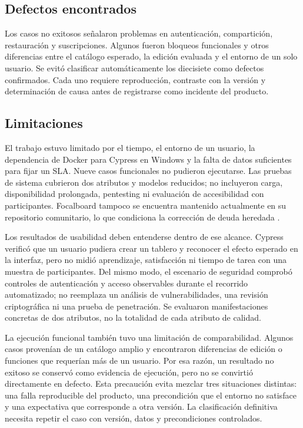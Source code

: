 \documentclass[conference]{IEEEtran}
\begin{document}
\subsection{Defectos encontrados}
Los casos no exitosos señalaron problemas en autenticación, compartición, restauración y suscripciones. Algunos fueron bloqueos funcionales y otros diferencias entre el catálogo esperado, la edición evaluada y el entorno de un solo usuario. Se evitó clasificar automáticamente los diecisiete como defectos confirmados. Cada uno requiere reproducción, contraste con la versión y determinación de causa antes de registrarse como incidente del producto.
\vspace{\baselineskip}

\subsection{Limitaciones}
El trabajo estuvo limitado por el tiempo, el entorno de un usuario, la dependencia de Docker para Cypress en Windows y la falta de datos suficientes para fijar un SLA. Nueve casos funcionales no pudieron ejecutarse. Las pruebas de sistema cubrieron dos atributos y modelos reducidos; no incluyeron carga, disponibilidad prolongada, pentesting ni evaluación de accesibilidad con participantes. Focalboard tampoco se encuentra mantenido actualmente en su repositorio comunitario, lo que condiciona la corrección de deuda heredada \cite{focalboardRepo}.

Los resultados de usabilidad deben entenderse dentro de ese alcance. Cypress verificó que un usuario pudiera crear un tablero y reconocer el efecto esperado en la interfaz, pero no midió aprendizaje, satisfacción ni tiempo de tarea con una muestra de participantes. Del mismo modo, el escenario de seguridad comprobó controles de autenticación y acceso observables durante el recorrido automatizado; no reemplaza un análisis de vulnerabilidades, una revisión criptográfica ni una prueba de penetración. Se evaluaron manifestaciones concretas de dos atributos, no la totalidad de cada atributo de calidad.

La ejecución funcional también tuvo una limitación de comparabilidad. Algunos casos provenían de un catálogo amplio y encontraron diferencias de edición o funciones que requerían más de un usuario. Por esa razón, un resultado no exitoso se conservó como evidencia de ejecución, pero no se convirtió directamente en defecto. Esta precaución evita mezclar tres situaciones distintas: una falla reproducible del producto, una precondición que el entorno no satisface y una expectativa que corresponde a otra versión. La clasificación definitiva necesita repetir el caso con versión, datos y precondiciones controlados.
\end{document}
